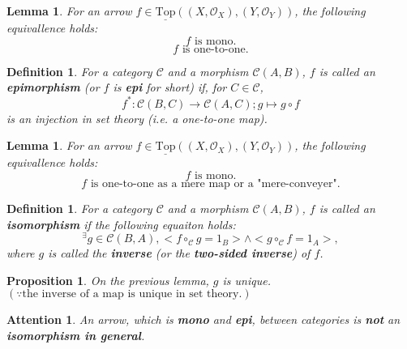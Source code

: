 \documentclass[dvipdfmx,10pt,notheorems]{beamer}
\newtheorem{attention}[theorem]{Attention}
\newtheorem{definition}[theorem]{Definition}
\newtheorem{proposition}[theorem]{Proposition}
\newtheorem{lemma}[theorem]{Lemma}
\renewcommand{\#}{^\sharp}
\begin{document}
	\begin{frame}
			\begin{lemma}
					For an arrow $f\in \underline{\mathrm{Top}}((X,\mathcal{O}_X),(Y,\mathcal{O}_Y))$,
					 the following equivallence holds:
							$$f \mbox{ is mono}.$$
							$$f \mbox{ is one-to-one}.$$
			\end{lemma}
	\end{frame}



	\begin{frame}
			\begin{definition}
					For a category $\mathcal{C}$ and a morphism $\mathcal{C}(A,B)$,
					$f$ is called an {\bf epimorphism} (or $f$ is {\bf epi} for short) if, for
					$C\in\mathcal{C}$, $$f^*:\mathcal{C}(B,C)\rightarrow\mathcal{C}(A,C);g\mapsto g\circ f$$
					is an injection in set theory (i.e. a one-to-one map).
			\end{definition}
	\end{frame}



	\begin{frame}
			\begin{lemma}
					For an arrow $f\in \underline{\mathrm{Top}}((X,\mathcal{O}_X),(Y,\mathcal{O}_Y))$,
					 the following equivallence holds:
							$$f \mbox{ is mono}.$$
							$$f \mbox{ is one-to-one as a mere map or a "mere-conveyer"}.$$
			\end{lemma}
	\end{frame}
	
	
	
	\begin{frame}
			\begin{definition}
					For a category $\mathcal{C}$ and a morphism $\mathcal{C}(A,B)$,
					$f$ is called an {\bf isomorphism} if the following equaiton holds:
							$${}^\exists g\in\mathcal{C}(B,A),<f\circ_{\mathcal{C}}g=1_B>\wedge<g\circ_{\mathcal{C}}f=1_A>,$$
					where $g$ is called the {\bf inverse} (or the {\bf two-sided inverse}) of $f$.
			\end{definition}
			\begin{proposition}
					On the previous lemma, $g$ is unique.\\
					$(\because \mbox{the inverse of a map is unique in set theory}.)$
			\end{proposition}
			\begin{attention}
					An arrow, which is {\bf mono} and {\bf epi}, between categories is {\bf not} an {\bf isomorphism in general}.
			\end{attention}
	\end{frame}
\end{document}
